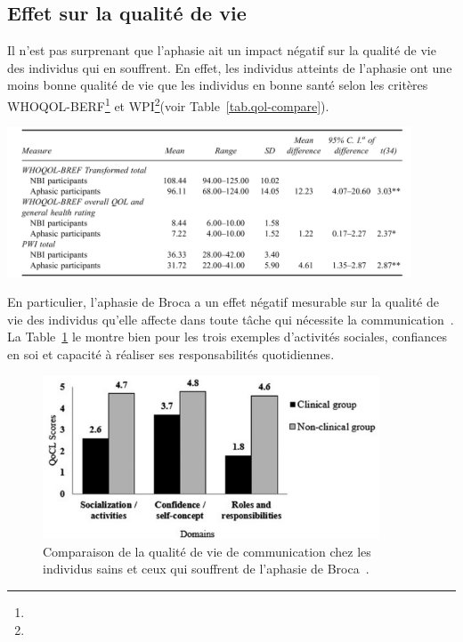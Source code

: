 \subsection{Effet sur la qualité de vie}

Il n'est pas surprenant que l'aphasie ait un impact négatif sur la qualité de vie des individus qui en souffrent.
En effet, les individus atteints de l'aphasie ont une moins bonne qualité de vie que les individus en bonne santé
selon les critères WHOQOL-BERF\footnote{} 
et WPI\footnote{}(voir Table~\ref{tab.qol-compare}).

\begin{table}[hbt]
    \centering
    \includegraphics[width=12cm]{assets/images/qol.png}
    \caption[Comparaison de la qualité de vie chez les individus sains et ceux qui souffrent d'une aphasie.]%
    {Comparaison de la qualité de vie chez les individus sains et ceux qui souffrent d'une aphasie~\cite{Ross_Wertz_2010}.}
    \label{tab.qol-compare}
\end{table}

En particulier, l'aphasie de Broca a un effet négatif mesurable sur la qualité de vie des individus qu'elle affecte
dans toute tâche qui nécessite la communication~\cite{Pallavi_Perumal_Krupa_2018}. 
La Table~\ref{fig.qocl-compare} le montre bien pour les trois exemples d'activités sociales, confiances en soi
et capacité à réaliser ses responsabilités quotidiennes.

\begin{figure}[hbt]
    \centering
    \includegraphics[width=10cm]{assets/images/qocl.png}
    \caption[Comparaison de la qualité de vie de communication chez les individus sains et ceux qui souffrent de l'aphasie de Broca.]%
    {Comparaison de la qualité de vie de communication chez les individus sains et ceux qui souffrent de l'aphasie de Broca~\cite{Pallavi_Perumal_Krupa_2018}.}
    \label{fig.qocl-compare}
\end{figure}


